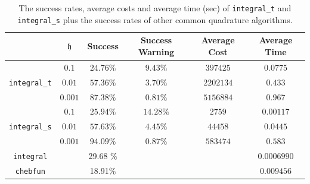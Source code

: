 \documentclass{iitthesis}
\theoremstyle{definition}
\theoremstyle{remark}
\begin{document}
\begin{table}[ht]
\caption{The success rates, average costs and average time (sec) of {\tt integral\_t} and {\tt integral\_s} plus the success rates of other common quadrature algorithms.}
\centering
\begin{tabular}{cccccc}
\hline\hline
& $\mathfrak{h}$ & Success & Success Warning & Average Cost & Average Time \\
\hline
&$0.1$  & $24.76\%$ &  $9.43\%$  & $397425$ & $0.0775$\\
{\tt integral\_t}
 &$0.01$  & $57.36\%$ & $3.70\%$ & $2202134$ & $0.433$\\
&$0.001$ & $87.38\%$ &$0.81\%$ & $5156884$ & $0.967$\\
\hline
&$0.1$  & $25.94\%$ &  $14.28\%$  & $2759$ & $0.00117$\\
{\tt integral\_s}
 &$0.01$  & $57.63\%$ & $4.45\%$ & $44458$ & $0.0445$\\
&$0.001$ & $94.09\%$ &$0.87\%$ & $583474$ & $0.583$\\
\hline
{\tt integral} &  & 29.68 \% & & &$0.0006990$\\
{\tt chebfun} &  &18.91\% & & &$0.009456$\\
\hline
\end{tabular}
\label{integresultstable}
\end{table}
\end{document}
